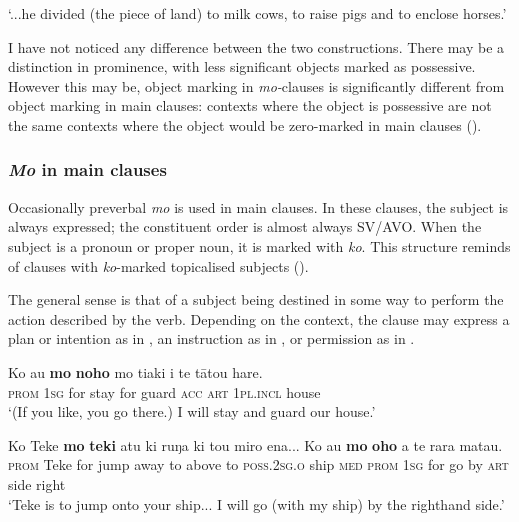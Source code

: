 \glt
‘...he divided (the piece of land) to milk cows, to raise pigs and to enclose horses.’ \textstyleExampleref{[R250.047]} 
\z

I have not noticed any difference between the two constructions. There may be a distinction in prominence, with less significant objects marked as possessive. However this may be, object marking in \textit{mo-}clauses is significantly different from object marking in main clauses: contexts where the object is possessive are not the same contexts where the object would be zero-marked in main clauses ().

\subsubsection{\textit{Mo} in main clauses}\label{sec:11.5.1.3}

Occasionally preverbal \textit{mo} is used in main clauses. In these clauses, the subject is always expressed; the constituent order is almost always SV/AVO. When the subject is a pronoun or proper noun, it is marked with \textit{ko}. This structure reminds of clauses with \textit{ko}{}-marked topicalised subjects ().

The general sense is that of a subject being destined in some way to perform the action described by the verb. Depending on the context, the clause may express a plan or intention as in , an instruction as in , or permission as in .

\ea\label{ex:11.158}
\gll Ko au \textbf{mo} \textbf{noho} mo tiaki i te tātou hare. \\
\textsc{prom} \textsc{1sg} for stay for guard \textsc{acc} \textsc{art} \textsc{1pl.incl} house \\

\glt 
‘(If you like, you go there.) I will stay and guard our house.’ \textstyleExampleref{[R399.130]} 
\z

\ea\label{ex:11.159}
\gll Ko Teke \textbf{mo} \textbf{teki} atu ki ruŋa ki to{\ꞌ}u miro ena... Ko au \textbf{mo} \textbf{oho}  a te rara mata{\ꞌ}u.\\
\textsc{prom} Teke for jump away to above to \textsc{poss.2sg.o} ship \textsc{med} \textsc{prom} \textsc{1sg} for go  by \textsc{art} side right\\

\glt 
‘Teke is to jump onto your ship... I will go (with my ship) by the righthand side.’ 
\z

